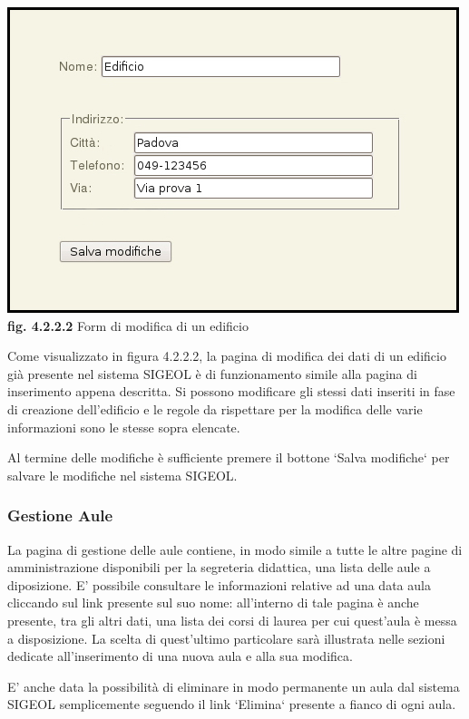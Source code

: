 \documentclass[11pt,a4paper]{article}
\begin{document}
\begin{center}
	\includegraphics[scale=0.5]{images/modifica_edificio.jpg}\\
	\textbf{fig. 4.2.2.2} Form di modifica di un edificio\\
\end{center}

Come visualizzato in figura 4.2.2.2, la pagina di modifica dei dati di un edificio già presente nel sistema SIGEOL è di funzionamento simile alla pagina di inserimento appena descritta. Si possono modificare gli stessi dati inseriti in fase di creazione dell'edificio e le regole da rispettare per la modifica delle varie informazioni sono le stesse sopra elencate.

Al termine delle modifiche è sufficiente premere il bottone `Salva modifiche` per salvare le modifiche nel sistema SIGEOL.
\subsubsection{Gestione Aule}
La pagina di gestione delle aule contiene, in modo simile a tutte le altre pagine di amministrazione disponibili per la segreteria didattica, una lista delle aule a diposizione.
E' possibile consultare le informazioni relative ad una data aula cliccando sul link presente sul suo nome: all'interno di tale pagina è anche presente, tra gli altri dati, una lista dei corsi di laurea per cui quest'aula è messa a disposizione. La scelta di quest'ultimo particolare sarà illustrata nelle sezioni dedicate all'inserimento di una nuova aula e alla sua modifica.

E' anche data la possibilità di eliminare in modo permanente un aula dal sistema SIGEOL semplicemente seguendo il link `Elimina` presente a fianco di ogni aula.
\end{document}
